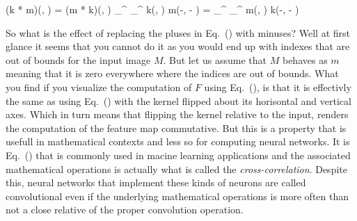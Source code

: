 \startplaceformula[reference=conv-commute]
\startformula
\startmathalignment
\NC (k * m)(\color[red]{x}, \color[red]{y}) \NC = (m * k)(\color[blue]{x}, \color[blue]{y}) \NR
\NC \sum_{\color[blue]{x}}^{} \sum_{\color[blue]{y}}^{} k(\color[blue]{x}, \color[blue]{y}) \cdot m(\color[red]{x}-\color[blue]{x}, \color[red]{y} - \color[blue]{y}) \NC
= \sum_{\color[red]{x}}^{} \sum_{\color[red]{y}}^{} m(\color[red]{x}, \color[red]{y}) \cdot k(\color[blue]{x}-\color[red]{x}, \color[blue]{y} - \color[red]{y}) \NR
\stopmathalignment
\stopformula
\stopplaceformula

\indentation
So what is the effect of replacing the pluses in Eq.~() with minuses?
Well at first glance it seems that you cannot do it as you would end up with indexes that are out of bounds for the input image $M$.
But let us assume that $M$ behaves as $m$ meaning that it is zero everywhere where the indices are out of bounds.
What you find if you visualize the computation of $F$ using Eq.~(), is that it is effectivly the same as using Eq.~() with the kernel flipped about its horisontal and vertical axes.
Which in turn means that flipping the kernel relative to the input, renders the computation of the feature map commutative.
But this is a property that is usefull in mathematical contexts and less so for computing neural networks.
It is Eq.~() that is commonly used in macine learning applications and the associated mathematical operations is actually what is called the {\em cross-correlation}.
Despite this, neural networks that implement these kinds of neurons are called convolutional even if the underlying mathematical operations is more often than not a close relative of the proper convolution operation.
